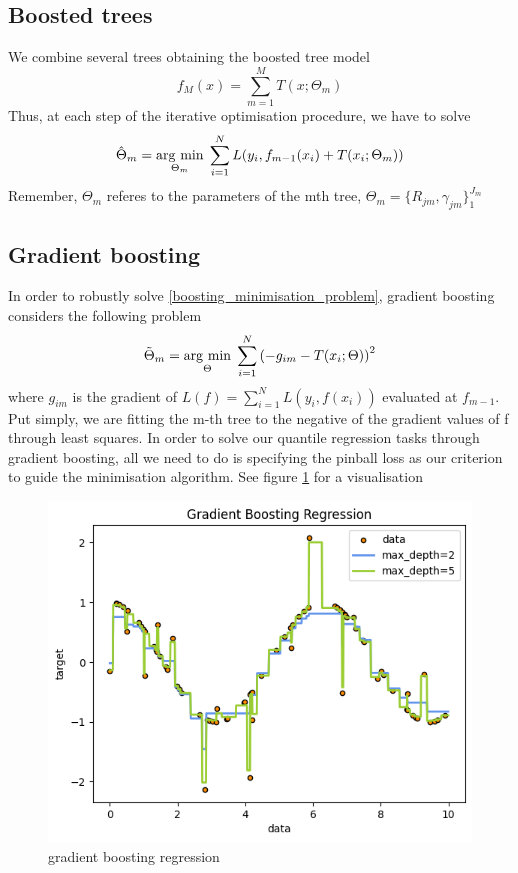\subsection{Boosted trees}
We combine several trees obtaining the boosted tree model
\begin{equation}
    f_M(x)=\sum\limits_{m=1}^M T(x;\Theta_m)
\end{equation}
Thus, at each step of the iterative optimisation procedure, we have to solve
\begin{equation}\label{boosting_minimisation_problem}
    \hat{\Theta}_m=\underset{\Theta_m}{\operatorname{arg}\,\operatorname{min}}\;\sum\limits_{i=1}^{N}L(y_i, f_{m-1}(x_i)+T(x_i;\Theta_m))
\end{equation}
Remember, $\Theta_m$ referes to the parameters of the mth tree, $\Theta_m=\{R_{jm}, \gamma_{jm}\}_1^{J_m}$
\subsection{Gradient boosting}
In order to robustly solve \ref{boosting_minimisation_problem}, gradient boosting considers the following problem
\begin{equation}
    \tilde{\Theta}_m=\underset{\Theta}{\operatorname{arg}\,\operatorname{min}}\;\sum\limits_{i=1}^{N}\left(-g_{im}-T(x_i;\Theta)\right)^2
\end{equation}
where $g_{im}$ is the gradient of $L(f)=\sum\limits_{i=1}^N L(y_i, f(x_i))$ evaluated at $f_{m-1}$. Put simply, we are fitting the m-th tree to the negative of the gradient values of f through least squares.
In order to solve our quantile regression tasks through gradient boosting, all we need to do is specifying the pinball loss as our criterion to guide the minimisation algorithm. See figure \ref{fig:gradient_boosting} for a visualisation
\begin{figure}
    \includegraphics[width=\textwidth]{images/gradient_boosting.png}
    \caption{gradient boosting regression}
    \label{fig:gradient_boosting}
\end{figure}



